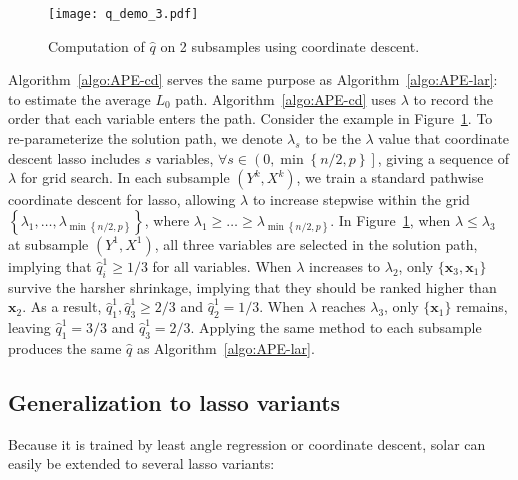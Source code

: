 \documentclass[11pt,review,authoryear]{elsarticle}
\begin{document}
\begin{figure}[ht]
  \centering
  \texttt{[image: q\_demo\_3.pdf]}
  \caption{Computation of $\widehat{q}$ on 2 subsamples using coordinate descent.}
  \label{fig:q_demo_3}
\end{figure}

Algorithm~\ref{algo:APE-cd} serves the same purpose as Algorithm~\ref{algo:APE-lar}: to estimate the average $L_0$ path. Algorithm~\ref{algo:APE-cd} uses $\lambda$ to record the order that each variable enters the path. Consider the example in Figure~\ref{fig:q_demo_3}. To re-parameterize the solution path, we denote $\lambda_s$ to be the $\lambda$ value that coordinate descent lasso includes $s$ variables, $\forall s\in \left( 0, \min \left\{ n/2, p \right\} \right]$, giving a sequence of $\lambda$ for grid search. In each subsample $\left( Y^k, X^k \right)$, we train a standard pathwise coordinate descent for lasso, allowing $\lambda$ to increase stepwise within the grid $\left\{\lambda_1, \ldots, \lambda_{ \min \left\{ n/2, p \right\} } \right\}$, where $\lambda_1 \geqslant \ldots \geqslant \lambda_{ \min \left\{ n/2, p \right\} }$. In Figure~\ref{fig:q_demo_3}, when $\lambda \leqslant \lambda_3$ at subsample $\left( Y^1, X^1 \right)$, all three variables are selected in the solution path, implying that $\widehat{q}^1_i \geqslant 1/3$ for all variables. When $\lambda$ increases to $\lambda_2$, only $\{\mathbf{x}_3, \mathbf{x}_1\}$ survive the harsher shrinkage, implying that they should be ranked higher than $\mathbf{x}_2$. As a result, $\widehat{q}^1_1, \widehat{q}^1_3 \geqslant 2/3$ and $\widehat{q}^1_2 = 1/3$. When $\lambda$ reaches $\lambda_3$, only $\{\mathbf{x}_1\}$ remains, leaving $\widehat{q}^1_1 = 3/3$ and $\widehat{q}^1_3 = 2/3$. Applying the same method to each subsample produces the same $\widehat{q}$ as Algorithm~\ref{algo:APE-lar}.

\subsection{Generalization to lasso variants}
\label{subsec:variant}

Because it is trained by least angle regression or coordinate descent, solar can easily be extended to several lasso variants:
\end{document}
